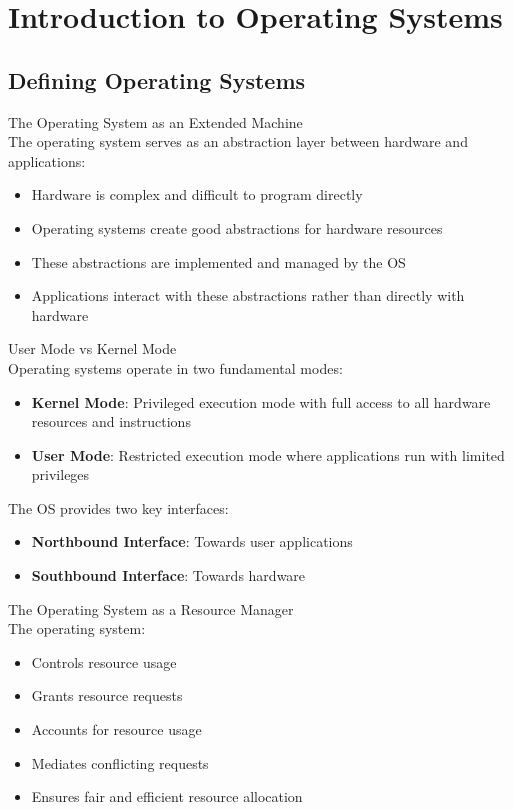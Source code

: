 \section{Introduction to Operating Systems}

\subsection{Defining Operating Systems}

\begin{concept}{The Operating System as an Extended Machine}\\
    The operating system serves as an abstraction layer between hardware and applications:
    \begin{itemize}
        \item Hardware is complex and difficult to program directly
        \item Operating systems create good abstractions for hardware resources
        \item These abstractions are implemented and managed by the OS
        \item Applications interact with these abstractions rather than directly with hardware
    \end{itemize}
\end{concept}

\begin{definition}{User Mode vs Kernel Mode}\\
    Operating systems operate in two fundamental modes:
    \begin{itemize}
        \item \textbf{Kernel Mode}: Privileged execution mode with full access to all hardware resources and instructions
        \item \textbf{User Mode}: Restricted execution mode where applications run with limited privileges
    \end{itemize}
    
    The OS provides two key interfaces:
    \begin{itemize}
        \item \textbf{Northbound Interface}: Towards user applications
        \item \textbf{Southbound Interface}: Towards hardware
    \end{itemize}
\end{definition}

\begin{concept}{The Operating System as a Resource Manager}\\
    The operating system:
    \begin{itemize}
        \item Controls resource usage
        \item Grants resource requests
        \item Accounts for resource usage
        \item Mediates conflicting requests
        \item Ensures fair and efficient resource allocation
    \end{itemize}
\end{concept}

